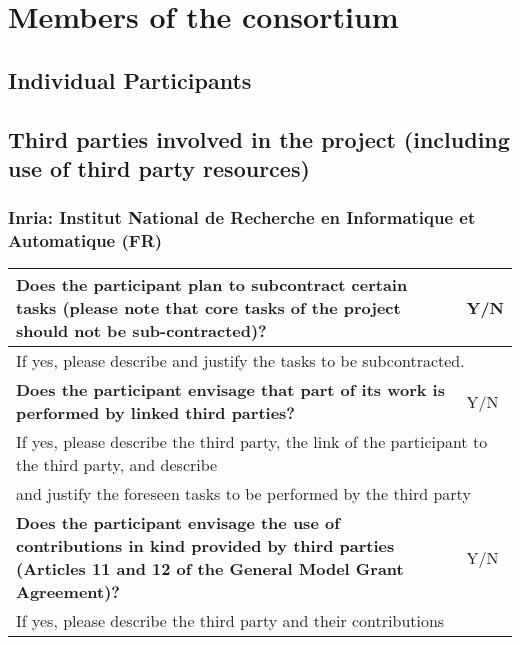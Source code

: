 \chapter{Members of the consortium}

\section{Individual Participants}
\label{sec:partners}






























\section{Third parties involved in the project (including use of third party resources)}

\subsection{Inria: Institut National de Recherche en Informatique et
  Automatique (FR)}

\begin{longtable}{|p{}|p{}|}
\hline
{\bf Does the participant plan to subcontract certain tasks (please
  note that core tasks of the project should not be sub-contracted)?}
&
Y/N
\\
\hline
\multicolumn{2}{|l|}{
If yes, please describe and justify the tasks to be subcontracted.}
\\
\hline
{\bf Does the participant envisage that  part of its work is performed
  by linked third parties?}
&
Y/N
\\
\hline
\multicolumn{2}{|l|}{If yes, please describe the third party, the link of the
  participant to the third party, and describe}\\
\multicolumn{2}{|l|}{and justify the foreseen
tasks to be performed by the third party}
\\
\hline
{\bf Does the participant envisage the use of contributions in kind
provided by third parties (Articles 11 and 12 of the General Model
Grant Agreement)?}
&
Y/N
\\
\hline
\multicolumn{2}{|l|}{If yes, please describe the third party and their contributions}
\\
\hline
\end{longtable}

